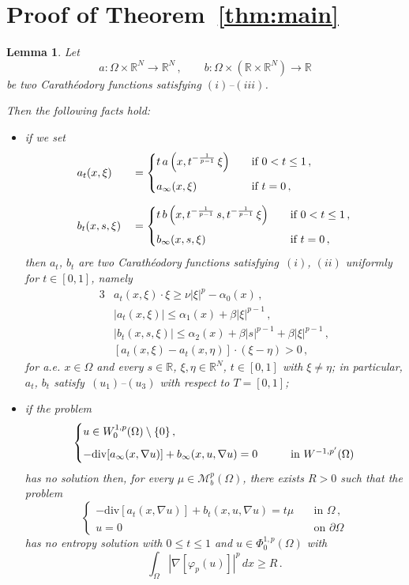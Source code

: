 \documentclass[twoside,reqno]{amsart}
\numberwithin{equation}{section}
\newtheorem{lem}[thm]{Lemma}
\theoremstyle{definition}
\newcommand{\R}{\mathbb{R}}
\begin{document}
\section{Proof of Theorem~\ref{thm:main}}
\label{sect:main}
%
\begin{lem}
\label{lem:apriori}
Let
\[
a:\Omega\times\R^N\rightarrow\R^N\,,\qquad
b:\Omega\times(\R\times\R^N)\rightarrow\R
\]
be two Carath\'eodory functions satisfying $(i)$--$(iii)$.
\par
Then the following facts hold:
\begin{itemize}
\item[$(a)$]
if we set
\begin{alignat*}{3}
&a_t(x,\xi) &&= 
\begin{cases}
t\,a\left(x,t^{-\frac{1}{p-1}}\,\xi\right)
&\quad\text{if $0<t\leq 1$}\,,\\
\noalign{\medskip}
a_\infty(x,\xi)
&\quad\text{if $t=0$}\,,
\end{cases}
\\
\noalign{\medskip}
&b_t(x,s,\xi) &&= 
\begin{cases}
t\,b\left(x,t^{-\frac{1}{p-1}}\,s,t^{-\frac{1}{p-1}}\,\xi\right)
&\quad\text{if $0<t\leq 1$}\,,\\
\noalign{\medskip}
b_\infty(x,s,\xi)
&\quad\text{if $t=0$}\,,
\end{cases}
\end{alignat*}
then $a_t$, $b_t$ are two Carath\'eodory functions 
satisfying~$(i)$, $(ii)$ uniformly for $t\in[0,1]$, namely
\begin{alignat}{3}
\label{eq:atmain}
&a_t(x,\xi)\cdot\xi \geq \nu |\xi|^p - \alpha_0(x)\,,\\
&|a_t(x,\xi)| \leq \alpha_1(x) + \beta|\xi|^{p-1} \,,\\
\label{eq:btmain}
&|b_t(x,s,\xi)|\leq \alpha_2(x) 
+ \beta|s|^{p-1} +\beta|\xi|^{p-1}\,,\\
&[a_t(x,\xi)-a_t(x,\eta)]\cdot(\xi-\eta) >0\,,
\end{alignat}
for a.e. $x\in\Omega$ and every $s\in\R$, $\xi, \eta\in\R^N$, 
$t\in[0,1]$ with $\xi\neq\eta$;
in particular, $a_t$, $b_t$ satisfy~$(u_1)$--$(u_3)$ with respect 
to $T=[0,1]$;
\item[$(b)$]
if the problem
\[
\begin{cases}
u\in W^{1,p}_0(\Omega)\setminus\{0\}\,,\\
\noalign{\medskip}
- \mathrm{div}[a_{\infty}(x,\nabla u)] 
+ b_{\infty}(x,u,\nabla u)=0
&\qquad\text{in $W^{-1,p'}(\Omega)$}
\end{cases}
\]
has no solution then, for every 
$\mu\in\mathcal{M}_b^p(\Omega)$,
there exists $R>0$ such that the problem
\begin{equation}
\label{eq:bmumain}
\begin{cases}
- \mathrm{div}[a_t(x,\nabla u)] + b_t(x,u,\nabla u)=
t\mu
&\quad\text{in $\Omega$}\,,\\
u=0
&\quad\text{on $\partial\Omega$}
\end{cases}
\end{equation}
has no entropy solution with $0\leq t\leq 1$ and
$u\in \Phi^{1,p}_0(\Omega)$ with
\[
\int_\Omega |\nabla[\varphi_p(u)]|^p\,dx \geq R\,.
\]
\end{itemize}
\end{lem}
\end{document}
